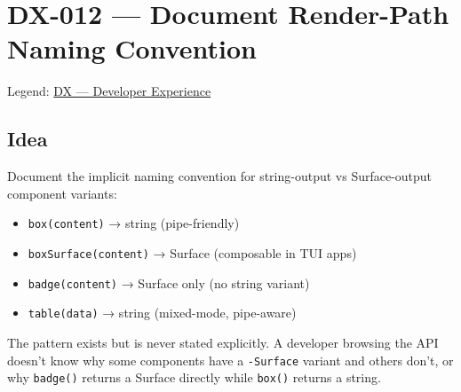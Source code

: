 \chapter{DX-012 --- Document Render-Path Naming Convention}\label{record-317}

\smallskip

Legend: \href{https://github.com/flyingrobots/bijou/blob/cbd70612140e7a450d764b3c7be1c6af878b99bc/docs/method/graveyard/legends/DX-developer-experience.md}{DX --- Developer Experience}

\section{Idea}\label{record-317-idea}

Document the implicit naming convention for string-output vs Surface-output component variants:

\begin{itemize}
\tightlist
\item
  \texttt{b\allowbreak{}o\allowbreak{}x\allowbreak{}(\allowbreak{}c\allowbreak{}o\allowbreak{}n\allowbreak{}t\allowbreak{}e\allowbreak{}n\allowbreak{}t\allowbreak{})} → string (pipe-friendly)
\item
  \texttt{b\allowbreak{}o\allowbreak{}x\allowbreak{}S\allowbreak{}u\allowbreak{}r\allowbreak{}f\allowbreak{}a\allowbreak{}c\allowbreak{}e\allowbreak{}(\allowbreak{}c\allowbreak{}o\allowbreak{}n\allowbreak{}t\allowbreak{}e\allowbreak{}n\allowbreak{}t\allowbreak{})} → Surface (composable in TUI apps)
\item
  \texttt{b\allowbreak{}a\allowbreak{}d\allowbreak{}g\allowbreak{}e\allowbreak{}(\allowbreak{}c\allowbreak{}o\allowbreak{}n\allowbreak{}t\allowbreak{}e\allowbreak{}n\allowbreak{}t\allowbreak{})} → Surface only (no string variant)
\item
  \texttt{t\allowbreak{}a\allowbreak{}b\allowbreak{}l\allowbreak{}e\allowbreak{}(\allowbreak{}d\allowbreak{}a\allowbreak{}t\allowbreak{}a\allowbreak{})} → string (mixed-mode, pipe-aware)
\end{itemize}

The pattern exists but is never stated explicitly. A developer browsing the API doesn't know why some components have a \texttt{-\allowbreak{}S\allowbreak{}u\allowbreak{}r\allowbreak{}f\allowbreak{}a\allowbreak{}c\allowbreak{}e} variant and others don't, or why \texttt{b\allowbreak{}a\allowbreak{}d\allowbreak{}g\allowbreak{}e\allowbreak{}(\allowbreak{})} returns a Surface directly while \texttt{b\allowbreak{}o\allowbreak{}x\allowbreak{}(\allowbreak{})} returns a string.

